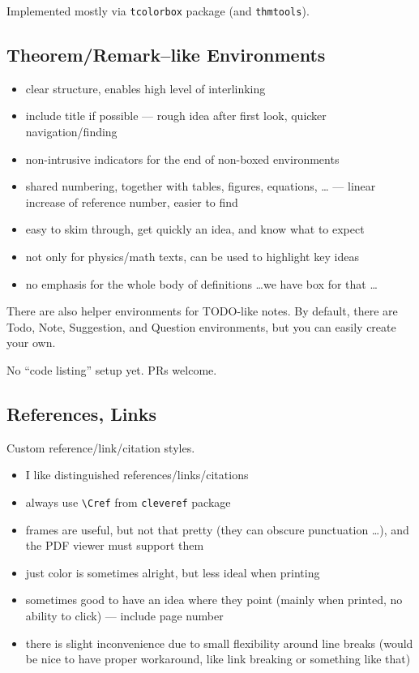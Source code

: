 Implemented mostly via \texttt{tcolorbox} package (and \texttt{thmtools}).

\subsection{Theorem/Remark--like Environments}%
\label{sub:Theorem/Remark--like Environments}

\begin{itemize}
    \item clear structure, enables high level of interlinking
    \item include title if possible --- rough idea after first look, quicker navigation/finding
    \item non-intrusive indicators for the end of non-boxed environments
    \item shared numbering, together with tables, figures, equations, \ldots
          --- linear increase of reference number, easier to find
    \item easy to skim through, get quickly an idea, and know what to expect
    \item not only for physics/math texts, can be used to highlight key ideas
    \item no emphasis for the whole body of definitions \ldots we have box for that \ldots
\end{itemize}

\begin{remark}
    There are also helper environments for \textsf{TODO}-like notes.
    By default, there are \textsf{Todo}, \textsf{Note}, \textsf{Suggestion}, and \textsf{Question} environments, but you can easily create your own.
\end{remark}

\begin{Note}
    No \enquote{code listing} setup yet.
    PRs welcome.
\end{Note}

\subsection{References, Links}%
\label{sub:References Links}

Custom reference/link/citation styles.
\begin{itemize}
    \item I like distinguished references/links/citations
    \item always use \verb|\Cref| from \texttt{cleveref} package
    \item frames are useful, but not that pretty (they can obscure punctuation \ldots),
          and the PDF viewer must support them
    \item just color is sometimes alright, but less ideal when printing
    \item sometimes good to have an idea where they point (mainly when printed, no ability to click) --- include page number
    \item there is slight inconvenience due to small flexibility around line breaks (would be nice to have proper workaround, like link breaking or something like that)
\end{itemize}

